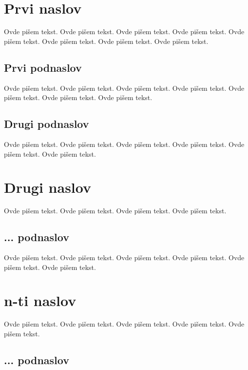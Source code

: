 \documentclass[a4paper]{article}
\begin{document}
\section{Prvi naslov}
\label{sec:naslov1}


Ovde pišem tekst. 
Ovde pišem tekst. 
Ovde pišem tekst. 
Ovde pišem tekst. 
Ovde pišem tekst. 
Ovde pišem tekst. 
Ovde pišem tekst. 
Ovde pišem tekst. 


\subsection{Prvi podnaslov}
\label{subsec:podnaslov1}

Ovde pišem tekst. 
Ovde pišem tekst. 
Ovde pišem tekst. 
Ovde pišem tekst. 
Ovde pišem tekst. 
Ovde pišem tekst. 
Ovde pišem tekst. 

\subsection{Drugi podnaslov}
\label{subsec:podnaslov2}

Ovde pišem tekst. 
Ovde pišem tekst. 
Ovde pišem tekst. 
Ovde pišem tekst. 
Ovde pišem tekst. 
Ovde pišem tekst. 

\section{Drugi naslov}
\label{sec:naslov2}

Ovde pišem tekst. 
Ovde pišem tekst. 
Ovde pišem tekst. 
Ovde pišem tekst. 

\subsection{... podnaslov}
\label{subsec:podnaslovN}

Ovde pišem tekst. 
Ovde pišem tekst. 
Ovde pišem tekst. 
Ovde pišem tekst. 
Ovde pišem tekst. 
Ovde pišem tekst. 

\section{n-ti naslov}
\label{sec:naslovN}

Ovde pišem tekst. 
Ovde pišem tekst. 
Ovde pišem tekst. 
Ovde pišem tekst. 
Ovde pišem tekst. 

\subsection{... podnaslov}
\label{subsec:podnaslovK}
\end{document}
